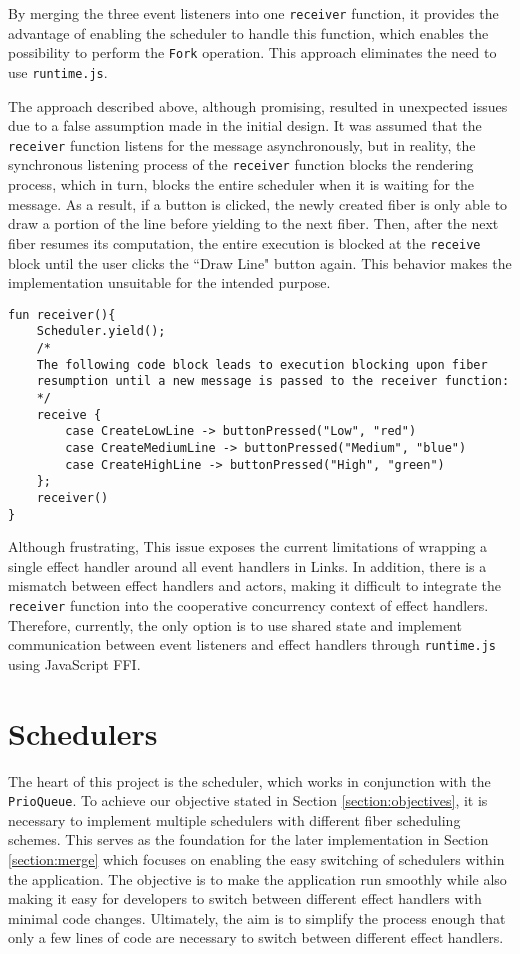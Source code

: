 \documentclass[logo,bsc,singlespacing,parskip]{infthesis}
\begin{document}
By merging the three event listeners into one \texttt{receiver} function, it provides the advantage of enabling the scheduler to handle this function, which enables the possibility to perform the \texttt{Fork} operation. This approach eliminates the need to use \texttt{runtime.js}.

The approach described above, although promising, resulted in unexpected issues due to a false assumption made in the initial design. It was assumed that the \texttt{receiver} function listens for the message asynchronously, but in reality, the synchronous listening process of the \texttt{receiver} function blocks the rendering process, which in turn, blocks the entire scheduler when it is waiting for the message. As a result, if a button is clicked, the newly created fiber is only able to draw a portion of the line before yielding to the next fiber. Then, after the next fiber resumes its computation, the entire execution is blocked at the \texttt{receive} block until the user clicks the ``Draw Line" button again. This behavior makes the implementation unsuitable for the intended purpose.

\begin{verbatim}
fun receiver(){
    Scheduler.yield();
    /*
    The following code block leads to execution blocking upon fiber
    resumption until a new message is passed to the receiver function:
    */
    receive { 
        case CreateLowLine -> buttonPressed("Low", "red")
        case CreateMediumLine -> buttonPressed("Medium", "blue")
        case CreateHighLine -> buttonPressed("High", "green")
    };
    receiver()
}
\end{verbatim}

Although frustrating, This issue exposes the current limitations of wrapping a single effect handler around all event handlers in Links. In addition, there is a mismatch between effect handlers and actors, making it difficult to integrate the \texttt{receiver} function into the cooperative concurrency context of effect handlers. Therefore, currently, the only option is to use shared state and implement communication between event listeners and effect handlers through \texttt{runtime.js} using JavaScript FFI.

\section{Schedulers}
\label{section:schedulers}

The heart of this project is the scheduler, which works in conjunction with the \texttt{PrioQueue}. To achieve our objective stated in Section \ref{section:objectives}, it is necessary to implement multiple schedulers with different fiber scheduling schemes. This serves as the foundation for the later implementation in Section \ref{section:merge} which focuses on enabling the easy switching of schedulers within the application. The objective is to make the application run smoothly while also making it easy for developers to switch between different effect handlers with minimal code changes. Ultimately, the aim is to simplify the process enough that only a few lines of code are necessary to switch between different effect handlers.
\end{document}
